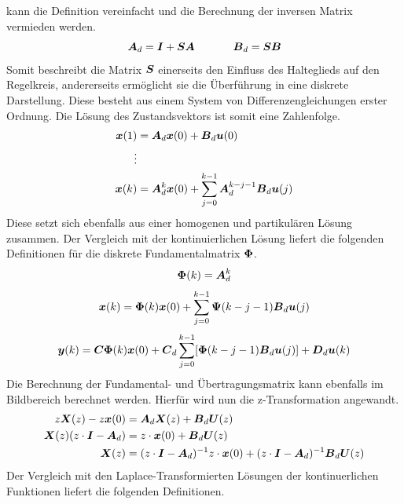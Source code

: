 kann die Definition vereinfacht und die Berechnung der inversen Matrix vermieden werden.
\begin{equation}
\boldsymbol{A}_d = \boldsymbol{I}+\boldsymbol{S}\boldsymbol{A} \hspace{35pt} \boldsymbol{B}_d=\boldsymbol{S}\boldsymbol{B}
\end{equation}
Somit beschreibt die Matrix $\boldsymbol{S}$ einerseits den Einfluss des Halteglieds auf den Regelkreis, andererseits ermöglicht sie die Überführung in eine diskrete Darstellung. Diese besteht aus einem System von Differenzengleichungen erster Ordnung. Die Lösung des Zustandsvektors ist somit eine Zahlenfolge.
\begin{equation}
\begin{split}
\boldsymbol{x}(1) &= \boldsymbol{A}_d\boldsymbol{x}(0)+\boldsymbol{B}_d\boldsymbol{u}(0) \\
\vdots & \\
\boldsymbol{x}(k)&=\boldsymbol{A}^k_d\boldsymbol{x}(0)+\sum^{k-1}_{j=0}\boldsymbol{A}^{k-j-1}_d \boldsymbol{B}_d\boldsymbol{u}(j)
\end{split}
\end{equation}
Diese setzt sich ebenfalls aus einer homogenen und partikulären Lösung zusammen. Der Vergleich mit der kontinuierlichen Lösung liefert die folgenden Definitionen für die diskrete Fundamentalmatrix $\boldsymbol{\Phi}$.
\begin{equation}
\boldsymbol{\Phi}(k) = \boldsymbol{A}^k_d
\end{equation}
\begin{equation}
\boldsymbol{x}(k) = \boldsymbol{\Phi}(k)\boldsymbol{x}(0)+\sum^{k-1}_{j=0} \boldsymbol{\Psi}(k-j-1)\boldsymbol{B}_d\boldsymbol{u}(j)
\end{equation}
\begin{equation}
\boldsymbol{y}(k) = \boldsymbol{C}\boldsymbol{\Phi}(k)\boldsymbol{x}(0)+\boldsymbol{C}_d\sum^{k-1}_{j=0}[ \boldsymbol{\Phi}(k-j-1)\boldsymbol{B}_d\boldsymbol{u}(j)] +\boldsymbol{D}_d\boldsymbol{u}(k)
\end{equation}
Die Berechnung der Fundamental- und Übertragungsmatrix kann ebenfalls im Bildbereich berechnet werden. Hierfür wird nun die z-Transformation angewandt.
\begin{equation}
\begin{split}
z\boldsymbol{X}(z)-z\boldsymbol{x}(0) &= \boldsymbol{A}_d\boldsymbol{X}(z)+\boldsymbol{B}_d\boldsymbol{U}(z) \\
\boldsymbol{X}(z)(z\cdot\boldsymbol{I}-\boldsymbol{A}_d) &= z\cdot\boldsymbol{x}(0)+\boldsymbol{B}_d\boldsymbol{U}(z) \\
\boldsymbol{X}(z) &= (z\cdot\boldsymbol{I}-\boldsymbol{A}_d)^{-1}z\cdot \boldsymbol{x}(0) + (z\cdot\boldsymbol{I}-\boldsymbol{A}_d)^{-1}\boldsymbol{B}_d\boldsymbol{U}(z)
\end{split}
\end{equation}
Der Vergleich mit den Laplace-Transformierten Lösungen der kontinuerlichen Funktionen liefert die folgenden Definitionen.
